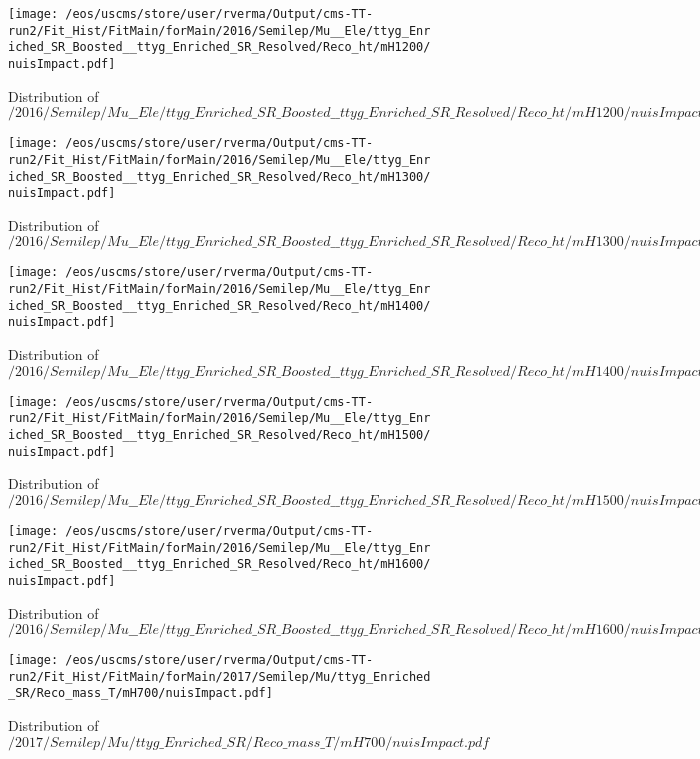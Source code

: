 \begin{figure}
\centering
\texttt{[image: /eos/uscms/store/user/rverma/Output/cms-TT-run2/Fit\_Hist/FitMain/forMain/2016/Semilep/Mu\_\_Ele/ttyg\_Enriched\_SR\_Boosted\_\_ttyg\_Enriched\_SR\_Resolved/Reco\_ht/mH1200/nuisImpact.pdf]}
\caption{Distribution of $/2016/Semilep/Mu\_\_Ele/ttyg\_Enriched\_SR\_Boosted\_\_ttyg\_Enriched\_SR\_Resolved/Reco\_ht/mH1200/nuisImpact.pdf$}
\end{figure}

\begin{figure}
\centering
\texttt{[image: /eos/uscms/store/user/rverma/Output/cms-TT-run2/Fit\_Hist/FitMain/forMain/2016/Semilep/Mu\_\_Ele/ttyg\_Enriched\_SR\_Boosted\_\_ttyg\_Enriched\_SR\_Resolved/Reco\_ht/mH1300/nuisImpact.pdf]}
\caption{Distribution of $/2016/Semilep/Mu\_\_Ele/ttyg\_Enriched\_SR\_Boosted\_\_ttyg\_Enriched\_SR\_Resolved/Reco\_ht/mH1300/nuisImpact.pdf$}
\end{figure}

\begin{figure}
\centering
\texttt{[image: /eos/uscms/store/user/rverma/Output/cms-TT-run2/Fit\_Hist/FitMain/forMain/2016/Semilep/Mu\_\_Ele/ttyg\_Enriched\_SR\_Boosted\_\_ttyg\_Enriched\_SR\_Resolved/Reco\_ht/mH1400/nuisImpact.pdf]}
\caption{Distribution of $/2016/Semilep/Mu\_\_Ele/ttyg\_Enriched\_SR\_Boosted\_\_ttyg\_Enriched\_SR\_Resolved/Reco\_ht/mH1400/nuisImpact.pdf$}
\end{figure}

\begin{figure}
\centering
\texttt{[image: /eos/uscms/store/user/rverma/Output/cms-TT-run2/Fit\_Hist/FitMain/forMain/2016/Semilep/Mu\_\_Ele/ttyg\_Enriched\_SR\_Boosted\_\_ttyg\_Enriched\_SR\_Resolved/Reco\_ht/mH1500/nuisImpact.pdf]}
\caption{Distribution of $/2016/Semilep/Mu\_\_Ele/ttyg\_Enriched\_SR\_Boosted\_\_ttyg\_Enriched\_SR\_Resolved/Reco\_ht/mH1500/nuisImpact.pdf$}
\end{figure}

\begin{figure}
\centering
\texttt{[image: /eos/uscms/store/user/rverma/Output/cms-TT-run2/Fit\_Hist/FitMain/forMain/2016/Semilep/Mu\_\_Ele/ttyg\_Enriched\_SR\_Boosted\_\_ttyg\_Enriched\_SR\_Resolved/Reco\_ht/mH1600/nuisImpact.pdf]}
\caption{Distribution of $/2016/Semilep/Mu\_\_Ele/ttyg\_Enriched\_SR\_Boosted\_\_ttyg\_Enriched\_SR\_Resolved/Reco\_ht/mH1600/nuisImpact.pdf$}
\end{figure}

\begin{figure}
\centering
\texttt{[image: /eos/uscms/store/user/rverma/Output/cms-TT-run2/Fit\_Hist/FitMain/forMain/2017/Semilep/Mu/ttyg\_Enriched\_SR/Reco\_mass\_T/mH700/nuisImpact.pdf]}
\caption{Distribution of $/2017/Semilep/Mu/ttyg\_Enriched\_SR/Reco\_mass\_T/mH700/nuisImpact.pdf$}
\end{figure}

